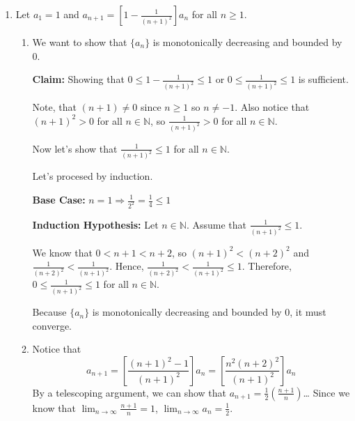 \documentclass[12pt]{article}
\begin{document}

\begin{enumerate}[start=1,label={\bfseries Problem \arabic*:},leftmargin=1in] %
    \item Let $a_{1} = 1$ and $a_{n+1} = [1 - \frac{1}{(n+1)^{2}}]a_{n}$ for all $n \geq 1$. 
    \begin{enumerate}
        \item We want to show that $\{ a_{n} \}$ is monotonically decreasing and bounded by 0. 
        
        \textbf{Claim:} Showing that $0 \leq 1 - \frac{1}{(n+1)^{2}} \leq 1$ or $0 \leq \frac{1}{(n+1)^{2}} \leq 1$ is sufficient. 

        Note, that $(n + 1) \neq 0$ since $n \geq 1$ so $n \neq -1$. Also notice that $(n+1)^{2} > 0$ for all $n \in \mathbb{N}$, so $\frac{1}{(n+1)^{2}} > 0$ for all $n \in \mathbb{N}$.  
        
        Now let's show that $\frac{1}{(n+1)^{2}} \leq 1$ for all $n \in \mathbb{N}$. 

        Let's procesed by induction. 
        
        \textbf{Base Case:} $n = 1 \Rightarrow \frac{1}{2^{2}} = \frac{1}{4} \leq 1$
        
        \textbf{Induction Hypothesis:} Let $n \in \mathbb{N}$. Assume that $\frac{1}{(n+1)^{2}} \leq 1$. 

        We know that $0 < n+1 < n+2$, so $(n+1)^{2} < (n+2)^{2}$ and $\frac{1}{(n+2)^{2}} < \frac{1}{(n+1)^{2}}$. 
        Hence, $\frac{1}{(n+2)^{2}} < \frac{1}{(n+1)^{2}} \leq 1$. Therefore, $0 \leq \frac{1}{(n+1)^{2}} \leq 1$ for all $n \in \mathbb{N}$. 

        Because $\{ a_{n} \}$ is monotonically decreasing and bounded by 0, it must converge. 
   
        \item Notice that \[a_{n+1} = [\frac{(n+1)^{2} - 1}{(n+1)^{2}}]a_{n} = [\frac{n^{2}(n+2)^{2}}{(n+1)^{2}}]a_{n}\]
        By a telescoping argument, we can show that $a_{n+1} = \frac{1}{2}(\frac{n+1}{n})$\dots
        Since we know that $\lim_{n \to \infty} \frac{n+1}{n} = 1$, $\lim_{n \to \infty} a_{n} = \frac{1}{2}$. 
    \end{enumerate}


\end{enumerate}
\end{document}
